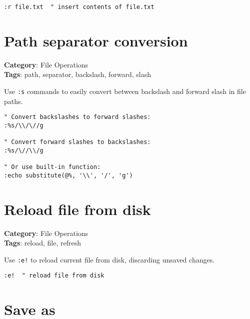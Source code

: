 {{{{{{\begin{Exa*}{}
\begin{Verbatim}[fontsize=\footnotesize, breaklines, breakanywhere]
:r file.txt  " insert contents of file.txt
\end{Verbatim}
\end{Exa*}

\section{Path separator conversion}

\textbf{Category}: File Operations\\ \textbf{Tags}: path, separator, backslash, forward, slash
\vspace{0.5cm}

Use {\footnotesize \Verb§:s§} commands to easily convert between backslash and forward slash in file paths.

\begin{Exa*}{}
\begin{Verbatim}[fontsize=\footnotesize, breaklines, breakanywhere]
" Convert backslashes to forward slashes:
:%s/\\/\//g

" Convert forward slashes to backslashes:
:%s/\//\\/g

" Or use built-in function:
:echo substitute(@%, '\\', '/', 'g')
\end{Verbatim}
\end{Exa*}

\section{Reload file from disk}

\textbf{Category}: File Operations\\ \textbf{Tags}: reload, file, refresh
\vspace{0.5cm}

Use {\footnotesize \Verb§:e!§} to reload current file from disk, discarding unsaved changes.

\begin{Exa*}{}
\begin{Verbatim}[fontsize=\footnotesize, breaklines, breakanywhere]
:e!  " reload file from disk
\end{Verbatim}
\end{Exa*}

\section{Save as}

}}}}}}
